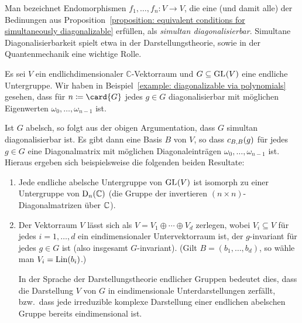 Man bezeichnet Endomorphismen $f_1, \dotsc, f_n \colon V \to V$, die eine (und damit alle) der Bedinungen aus Proposition~\ref{proposition: equivalent conditions for simultaneously diagonalizable} erfüllen, als \emph{simultan diagonalisierbar}.
Simultane Diagonalisierbarkeit spielt etwa in der Darstellungstheorie, sowie in der Quantenmechanik eine wichtige Rolle.

\begin{example}
  Es sei $V$ ein endlichdimensionaler $\mathbb{C}$-Vektorraum und $G \subseteq \GL{}{V}$ eine endliche Untergruppe.
  Wir haben in Beispiel~\ref{example: diagonalizable via polynomials} gesehen, dass für $n \defined \card{G}$ jedes $g \in G$ diagonalisierbar mit möglichen Eigenwerten $\omega_0, \dotsc, \omega_{n-1}$ ist.
  
  Ist $G$ abelsch, so folgt aus der obigen Argumentation, dass $G$ simultan diagonalisierbar ist.
  Es gibt dann eine Basis $B$ von $V$, so dass $\repmatrixendo{g}{B}$ für jedes $g \in G$ eine Diagonalmatrix mit möglichen Diagonaleinträgen $\omega_0, \dotsc, \omega_{n-1}$ ist.
  Hieraus ergeben sich beispielsweise die folgenden beiden Resultate:
  \begin{enumerate}
    \item
      Jede endliche abelsche Untergruppe von $\GL{}{V}$ ist isomorph zu einer Untergruppe von $\diagonalgroup{n}{\Complex}$ (die Gruppe der invertieren $(n \times n)$-Diagonalmatrizen über $\Complex$).
    \item
      Der Vektorraum $V$ lässt sich als $V = V_1 \oplus \dotsb \oplus V_d$ zerlegen, wobei $V_i \subseteq V$ für jedes $i = 1, \dotsc, d$ ein eindimensionaler Untervektorraum ist, der $g$-invariant für jedes $g \in G$ ist (also insgesamt $G$-invariant).
      (Gilt $B = (b_1, \dotsc, b_d)$, so wähle man $V_i = \Lin(b_i)$.)
      
      In der Sprache der Darstellungstheorie endlicher Gruppen bedeutet dies, dass die Darstellung $V$ von $G$ in eindimensionale Unterdarstellungen zerfällt, bzw.\ dass jede irreduzible komplexe Darstellung einer endlichen abelschen Gruppe bereits eindimensional ist.
  \end{enumerate}
\end{example}
